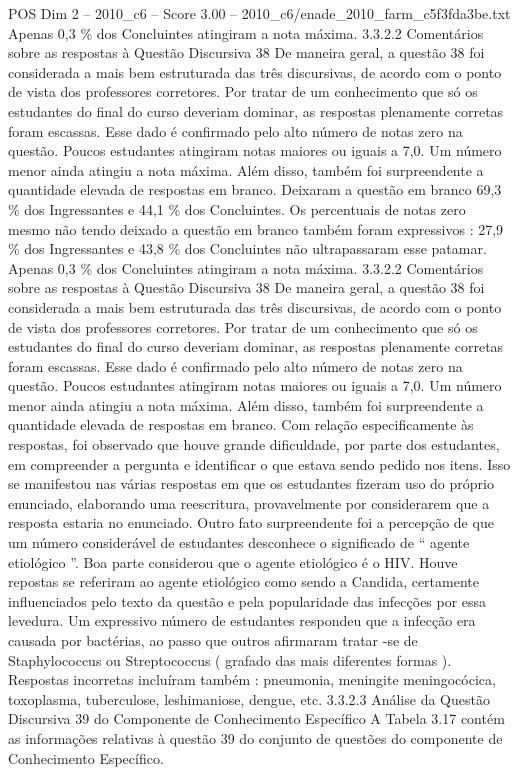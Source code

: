 \begin{textsample}{POS Dim 2 – 2010\_c6 – Score 3.00 – 2010\_c6/enade\_2010\_farm\_c5f3fda3be.txt}
Apenas 0,3 \% dos Concluintes atingiram a nota máxima. 3.3.2.2 Comentários sobre as respostas à Questão Discursiva 38 De maneira geral, a questão 38 foi considerada a mais bem estruturada das três discursivas, de acordo com o ponto de vista dos professores corretores.
Por tratar de um conhecimento que só os estudantes do final do curso deveriam dominar, as respostas plenamente corretas foram escassas.
Esse dado é confirmado pelo alto número de notas zero na questão.
Poucos estudantes atingiram notas maiores ou iguais a 7,0.
Um número menor ainda atingiu a nota máxima.
Além disso, também foi surpreendente a quantidade elevada de respostas em branco.
Deixaram a questão em branco 69,3 \% dos Ingressantes e 44,1 \% dos Concluintes.
Os percentuais de notas zero mesmo não tendo deixado a questão em branco também foram expressivos : 27,9 \% dos Ingressantes e 43,8 \% dos Concluintes não ultrapassaram esse patamar.
Apenas 0,3 \% dos Concluintes atingiram a nota máxima. 3.3.2.2 Comentários sobre as respostas à Questão Discursiva 38 De maneira geral, a questão 38 foi considerada a mais bem estruturada das três discursivas, de acordo com o ponto de vista dos professores corretores.
Por tratar de um conhecimento que só os estudantes do final do curso deveriam dominar, as respostas plenamente corretas foram escassas.
Esse dado é confirmado pelo alto número de notas zero na questão.
Poucos estudantes atingiram notas maiores ou iguais a 7,0.
Um número menor ainda atingiu a nota máxima.
Além disso, também foi surpreendente a quantidade elevada de respostas em branco.
Com relação especificamente às respostas, foi observado que houve grande dificuldade, por parte dos estudantes, em compreender a pergunta e identificar o que estava sendo pedido nos itens.
Isso se manifestou nas várias respostas em que os estudantes fizeram uso do próprio enunciado, elaborando uma reescritura, provavelmente por considerarem que a resposta estaria no enunciado.
Outro fato surpreendente foi a percepção de que um número considerável de estudantes desconhece o significado de “ agente etiológico ”.
Boa parte considerou que o agente etiológico é o HIV.
Houve repostas se referiram ao agente etiológico como sendo a Candida, certamente influenciados pelo texto da questão e pela popularidade das infecções por essa levedura.
Um expressivo número de estudantes respondeu que a infecção era causada por bactérias, ao passo que outros afirmaram tratar -se de Staphylococcus ou Streptococcus ( grafado das mais diferentes formas ).
Respostas incorretas incluíram também : pneumonia, meningite meningocócica, toxoplasma, tuberculose, leshimaniose, dengue, etc. 3.3.2.3 Análise da Questão Discursiva 39 do Componente de Conhecimento Específico A Tabela 3.17 contém as informações relativas à questão 39 do conjunto de questões do componente de Conhecimento Específico.

\end{textsample}
